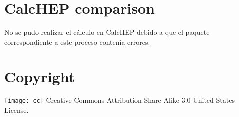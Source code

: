 \section{CalcHEP comparison}
No se pudo realizar el cálculo en CalcHEP debido a que el paquete correspondiente a este proceso contenía errores.



\section{Copyright}
\texttt{[image: cc]} Creative Commons Attribution-Share Alike 3.0 United States License.


